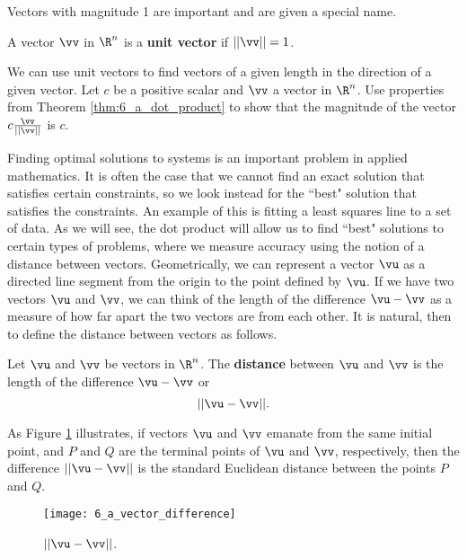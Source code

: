 Vectors with magnitude 1 are important and are given a special name.

\begin{definition} \label{def:6_a_unit_vector} A vector $\vv$ in $\R^n$ is a \textbf{unit vector} if $|| \vv || = 1$.
\end{definition}

We can use unit vectors to find vectors of a given length in the direction of a given vector. Let $c$ be a positive scalar and $\vv$ a vector in $\R^n$. Use properties from Theorem \ref{thm:6_a_dot_product} to show that the magnitude of the vector $c \frac{\vv}{||\vv||}$ is $c$.


\label{sec:dist_vec}

Finding optimal solutions to systems is an important problem in applied mathematics. It is often the case that we cannot find an exact solution that satisfies certain constraints, so we look instead for the ``best" solution that satisfies the constraints. An example of this is fitting a least squares line to a set of data. As we will see, the dot product will allow us to find ``best" solutions to certain types of problems, where we measure accuracy using the notion of a distance between vectors. Geometrically, we can represent a vector $\vu$ as a directed line segment from the origin to the point defined by $\vu$. If we have two vectors $\vu$ and $\vv$, we can think of the length of the difference $\vu - \vv$ as a measure of how far apart the two vectors are from each other. It is natural, then to define the distance between vectors as follows.

\begin{definition} \label{def:6_a_distance} Let $\vu$ and $\vv$ be vectors in $\R^n$. The \textbf{distance} between $\vu$ and $\vv$ is the length of the difference $\vu - \vv$ or
\[|| \vu - \vv ||.\]
\end{definition}


As Figure \ref{F:6_a_vector_difference} illustrates, if vectors $\vu$ and $\vv$ emanate from the same initial point, and $P$ and $Q$ are the terminal points of $\vu$ and $\vv$, respectively, then the difference $|| \vu - \vv||$  is the standard Euclidean distance between the points $P$ and $Q$. 
\begin{figure}[ht] \centering
\texttt{[image: 6\_a\_vector\_difference]}
\caption{$|| \vu - \vv||$.}
\label{F:6_a_vector_difference}
\end{figure}



